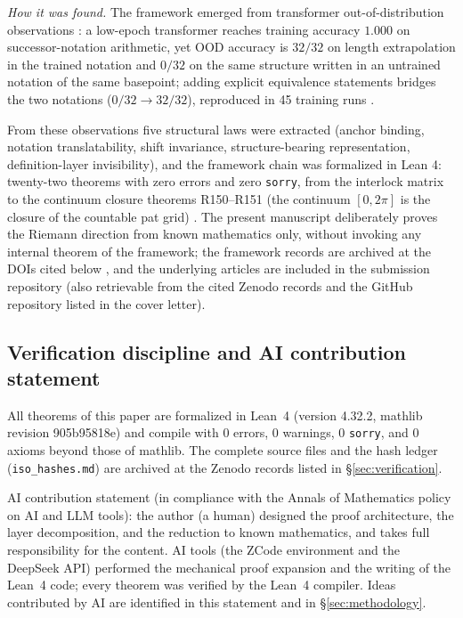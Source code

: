 \documentclass{article}
\begin{document}
\emph{How it was found.} The framework emerged from transformer
out-of-distribution observations \cite{patbase}: a low-epoch
transformer reaches training accuracy $1.000$ on successor-notation
arithmetic, yet OOD accuracy is $32/32$ on length extrapolation in the
trained notation and $0/32$ on the same structure written in an
untrained notation of the same basepoint; adding explicit equivalence
statements bridges the two notations ($0/32\to 32/32$), reproduced in
45 training runs \cite{fourtheorems}.

From these observations five structural laws were
extracted (anchor binding, notation translatability, shift invariance,
structure-bearing representation, definition-layer invisibility), and
the framework chain was formalized in Lean 4: twenty-two theorems with
zero errors and zero \texttt{sorry}, from the interlock matrix to the
continuum closure theorems R150--R151 (the continuum $[0,2\pi]$ is the
closure of the countable pat grid) \cite{patbase}. The present
manuscript deliberately proves the Riemann direction from known
mathematics only, without invoking any internal theorem of the
framework; the framework records are archived at the DOIs cited below
\cite{zenodo}, and the underlying articles are included in the
submission repository (also retrievable from the cited Zenodo records
and the GitHub repository listed in the cover letter).

\subsection{Verification discipline and AI contribution statement}
\label{sec:calibration}

All theorems of this paper are formalized in Lean~4 (version 4.32.2, mathlib
revision 905b95818e) and compile with $0$ errors, $0$ warnings, $0$
\texttt{sorry}, and $0$ axioms beyond those of mathlib. The complete source
files and the hash ledger (\texttt{iso\_hashes.md}) are archived at the
Zenodo records listed in \S\ref{sec:verification}.

AI contribution statement (in compliance with the Annals of Mathematics
policy on AI and LLM tools): the author (a human) designed the proof
architecture, the layer decomposition, and the reduction to known
mathematics, and takes full responsibility for the content. AI tools (the
ZCode environment and the DeepSeek API) performed the
mechanical proof expansion and the writing
of the Lean~4 code; every theorem was verified by the Lean~4 compiler. Ideas
contributed by AI are identified in this statement and in
\S\ref{sec:methodology}.
\end{document}
